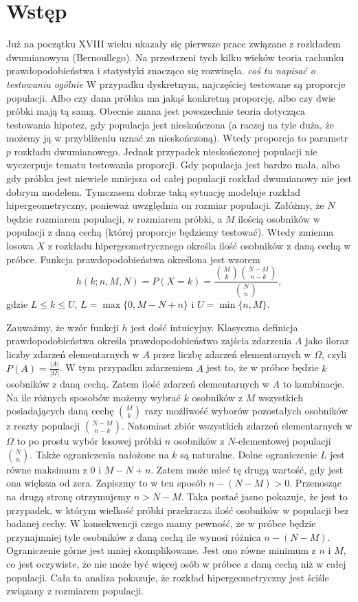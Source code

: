 \chapter*{Wstęp}
Już na początku XVIII wieku ukazały się pierwsze prace związane z rozkładem dwumianowym (Bernoullego). Na przestrzeni tych kilku wieków teoria rachunku prawdopodobieństwa i statystyki znacząco się rozwinęła. \textit{coś tu napisać o testowaniu ogólnie} W przypadku dyskretnym, najczęściej testowane są proporcje populacji. Albo czy dana próbka ma jakąś konkretną proporcję, albo czy dwie próbki mają tą samą. Obecnie znana jest powszechnie teoria dotycząca testowania hipotez, gdy populacja jest nieskończona (a raczej na tyle duża, że możemy ją w przybliżeniu uznać za nieskończoną). Wtedy proporcja to parametr $p$ rozkładu dwumianowego. Jednak przypadek nieskończonej populacji nie wyczerpuje tematu testowania proporcji. Gdy populacja jest bardzo mała, albo gdy próbka jest niewiele mniejsza od całej populacji rozkład dwumianowy nie jest dobrym modelem. Tymczasem dobrze taką sytuację modeluje rozkład hipergeometryczny, ponieważ uwzględnia on rozmiar populacji. Załóżmy, że $N$ będzie rozmiarem populacji, $n$ rozmiarem próbki, a $M$ ilością osobników w populacji z daną cechą (której proporcje będziemy testować). Wtedy zmienna losowa $X$ z rozkładu hipergeometrycznego określa ilość osobników z daną cechą w próbce. Funkcja prawdopodobieństwa określona jest wzorem
\begin{equation}
h(k;n,M,N) = P(X=k) = \frac{\binom{M}{k} \binom{N-M}{n-k}}{\binom{N}{n}},
\end{equation}
gdzie $L\leq k\leq U$, $L=\max\{0,M-N+n\}$ i $U=\min\{n,M\}$.

Zauważmy, że wzór funkcji $h$ jest dość intuicyjny. Klasyczna definicja prawdopodobieństwa określa prawdopodobieństwo zajścia zdarzenia $A$ jako iloraz liczby zdarzeń elementarnych w $A$ przez liczbę zdarzeń elementarnych w $\Omega$, czyli $P(A) = \frac{|A|}{|\Omega|}$. W tym przypadku zdarzeniem $A$ jest to, że w próbce będzie $k$ osobników z daną cechą. Zatem ilość zdarzeń elementarnych w $A$ to kombinacje. Na ile różnych sposobów możemy wybrać $k$ osobników z $M$ wszystkich posiadających daną cechę $\binom{M}{k}$ razy możliwość wyborów pozostałych osobników z reszty populacji $\binom{N-M}{n-k}$. Natomiast zbiór wszystkich zdarzeń elementarnych w $\Omega$ to po prostu wybór losowej próbki $n$ osobników z $N$-elementowej populacji $\binom{N}{n}$. Także ograniczenia nałożone na $k$ są naturalne. Dolne ograniczenie $L$ jest równe maksimum z $0$ i $M-N+n$. Zatem może mieć tę drugą wartość, gdy jest ona większa od zera. Zapiszmy to w ten sposób $n-(N-M)>0$. Przenosząc na drugą stronę otrzymujemy $n>N-M$. Taka postać jasno pokazuje, że jest to przypadek, w którym wielkość próbki przekracza ilość osobników w populacji bez badanej cechy. W konsekwencji czego mamy pewność, że w próbce będzie przynajmniej tyle osobników z daną cechą ile wynosi różnica $n-(N-M)$. Ograniczenie górne jest mniej skomplikowane. Jest ono równe minimum z $n$ i $M$, co jest oczywiste, że nie może być więcej osób w próbce z daną cechą niż w całej populacji. Cała ta analiza pokazuje, że rozkład hipergeometryczny jest ściśle związany z rozmiarem populacji.

